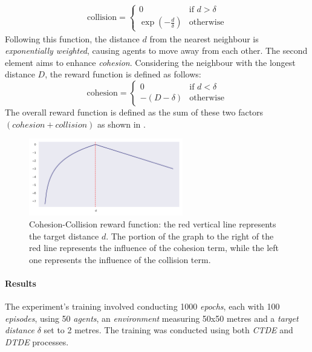 \documentclass[12pt,a4paper,openright,twoside]{book}
\begin{document}
    \begin{equation}
        \label{eq:collision-factor}
        \begin{split}
            \text{collision} = \begin{cases}
                0 & \text{if } d > \delta \\
                \exp\left(-\frac{d}{\delta}\right) & \text{otherwise}
            \end{cases}
        \end{split}
    \end{equation}
    Following this function, the distance $d$ from the nearest neighbour is \emph{exponentially weighted}, 
    causing agents to move away from each other.
    The second element aims to enhance \emph{cohesion}. Considering the neighbour with the longest distance $D$, 
    the reward function is defined as follows:
    \begin{equation}
        \text{cohesion} = \begin{cases}
            0 & \text{if } d < \delta \\
            -(D - \delta) & \text{otherwise}
        \end{cases}
    \end{equation}
    The overall reward function is defined as the sum of these two factors $(cohesion + collision)$ as shown in .

    \begin{figure}[t]
        \centering
        \includegraphics[width=0.6\textwidth]{figures/ccreward.pdf}
        \caption{Cohesion-Collision reward function: the red vertical line represents the target distance $d$.
            The portion of the graph to the right of the red line represents the influence of the cohesion term,
            while the left one represents the influence of the collision term.
        }
        \label{fig:cc-rf}
    \end{figure}

\paragraph{Results}
The experiment's training involved conducting 1000 \emph{epochs}, each with 100 \emph{episodes}, using 50 \emph{agents}, an 
    \emph{environment} measuring 50x50 metres and a \emph{target distance} $\delta$ set to 2 metres. The training was conducted 
    using both \emph{CTDE} and \emph{DTDE} processes.
\end{document}
